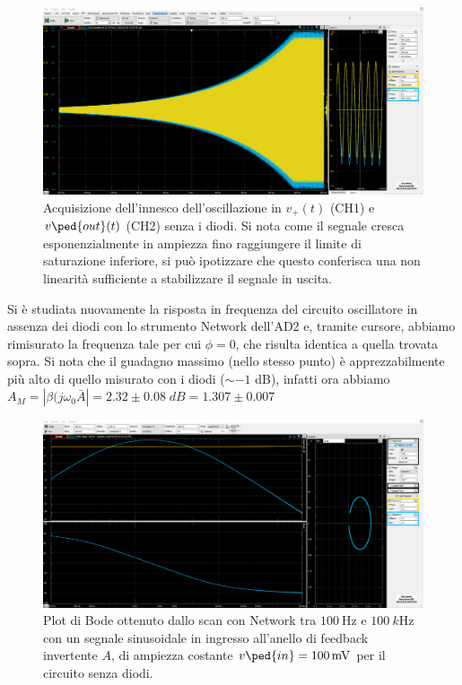 \documentclass[10pt, a4paper, italian]{article}
\begin{document}
\begin{figure}[htbp]
\centering
\includegraphics[width=\textwidth]{startnod}
\caption{Acquisizione dell'innesco dell'oscillazione in $v_+ (t)$ (CH1) e
	$v\ped{out} (t)$ (CH2) senza i diodi. Si nota come il segnale
	cresca esponenzialmente in ampiezza fino raggiungere il limite
	di saturazione inferiore, si può ipotizzare che questo conferisca una non
	linearità sufficiente a stabilizzare il segnale in uscita.}
\label{startnod}
\end{figure}

Si è studiata nuovamente la risposta in frequenza del circuito oscillatore in
assenza dei diodi con lo strumento Network dell'AD2 e, tramite cursore,
abbiamo rimisurato la frequenza tale per cui $\phi = 0$, che risulta identica
a quella trovata sopra. Si nota che il guadagno massimo (nello stesso punto)
è apprezzabilmente più alto di quello misurato con i diodi ($\sim - 1$ dB),
infatti ora abbiamo $A_M = |\beta(j\omega_0 \bar{A}| = 2.32 \pm 0.08 \; \si{dB}
= 1.307 \pm 0.007$

\begin{figure}[htbp]
    \centering
	\includegraphics[width=\textwidth]{AloopNOD}
    \caption{Plot di Bode ottenuto dallo scan con Network tra
    $\SI{100}{\Hz}$ e $\SI{100}{k\Hz}$ con un segnale sinusoidale in ingresso
    all'anello di feedback invertente $A$, di ampiezza costante
    $v\ped{in} = \SI{100}{m\V}$ per il circuito senza diodi.
    \label{fig: loopnod}}
\end{figure}
\end{document}
